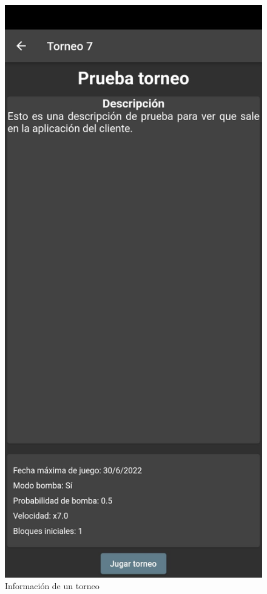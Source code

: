 \documentclass{article}
\begin{document}
\begin{figure}[H]
  \includegraphics[width=\textwidth]{imagenes/torneo.jpeg}
  \caption{Información de un torneo} 
\end{figure} 
\end{document}
